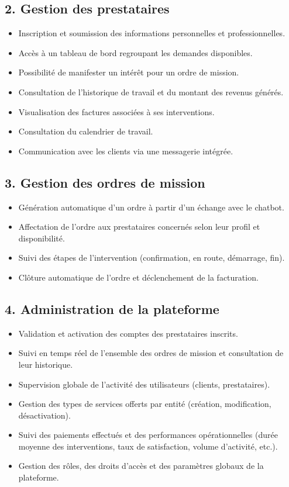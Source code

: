 \subsection*{2. Gestion des prestataires}
\begin{itemize}
    \item Inscription et soumission des informations personnelles et professionnelles.
    \item Accès à un tableau de bord regroupant les demandes disponibles.
    \item Possibilité de manifester un intérêt pour un ordre de mission.
    \item Consultation de l’historique de travail et du montant des revenus générés.
    \item Visualisation des factures associées à ses interventions.
    \item Consultation du calendrier de travail.
    \item Communication avec les clients via une messagerie intégrée.
\end{itemize}

\subsection*{3. Gestion des ordres de mission}
\begin{itemize}
    \item Génération automatique d’un ordre à partir d’un échange avec le chatbot.
    \item Affectation de l’ordre aux prestataires concernés selon leur profil et disponibilité.
    \item Suivi des étapes de l’intervention (confirmation, en route, démarrage, fin).
    \item Clôture automatique de l’ordre et déclenchement de la facturation.
\end{itemize}

\subsection*{4. Administration de la plateforme}
\begin{itemize}
    \item Validation et activation des comptes des prestataires inscrits.
    \item Suivi en temps réel de l’ensemble des ordres de mission et consultation de leur historique.
    \item Supervision globale de l’activité des utilisateurs (clients, prestataires).
    \item Gestion des types de services offerts par entité (création, modification, désactivation).
    \item Suivi des paiements effectués et des performances opérationnelles (durée moyenne des interventions, taux de satisfaction, volume d’activité, etc.).
    \item Gestion des rôles, des droits d’accès et des paramètres globaux de la plateforme.
\end{itemize}


